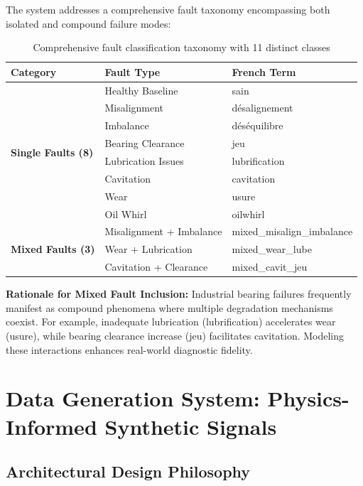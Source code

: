 \documentclass[11pt,a4paper]{article}
\begin{document}
The system addresses a comprehensive fault taxonomy encompassing both isolated and compound failure modes:

\begin{table}[h]
\centering
\small
\begin{tabular}{@{}lll@{}}
\toprule
\textbf{Category} & \textbf{Fault Type} & \textbf{French Term} \\
\midrule
\multirow{8}{*}{\textbf{Single Faults (8)}} 
    & Healthy Baseline & sain \\
    & Misalignment & désalignement \\
    & Imbalance & déséquilibre \\
    & Bearing Clearance & jeu \\
    & Lubrication Issues & lubrification \\
    & Cavitation & cavitation \\
    & Wear & usure \\
    & Oil Whirl & oilwhirl \\
\midrule
\multirow{3}{*}{\textbf{Mixed Faults (3)}} 
    & Misalignment + Imbalance & mixed\_misalign\_imbalance \\
    & Wear + Lubrication & mixed\_wear\_lube \\
    & Cavitation + Clearance & mixed\_cavit\_jeu \\
\bottomrule
\end{tabular}
\caption{Comprehensive fault classification taxonomy with 11 distinct classes}
\label{tab:fault_taxonomy}
\end{table}

\textbf{Rationale for Mixed Fault Inclusion:} Industrial bearing failures frequently manifest as compound phenomena where multiple degradation mechanisms coexist. For example, inadequate lubrication (lubrification) accelerates wear (usure), while bearing clearance increase (jeu) facilitates cavitation. Modeling these interactions enhances real-world diagnostic fidelity.

\section{Data Generation System: Physics-Informed Synthetic Signals}

\subsection{Architectural Design Philosophy}
\end{document}
